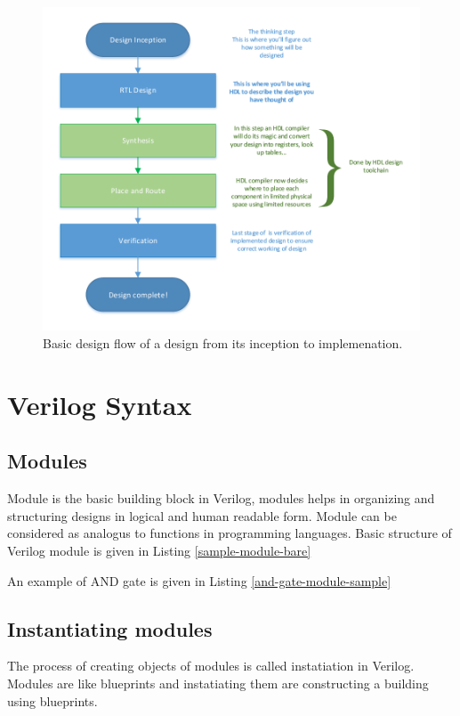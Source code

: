 \documentclass[a4paper,10pt]{article}
\theoremstyle{mytheor}
\newcommand{
  \insertverilog}[3]{
  
}
\begin{document}
\begin{figure}[h] \centering 
  \includegraphics[width=\linewidth]{./resources/hdl_design_flow.pdf}
  \caption{Basic design flow of a design from its inception to implemenation.}
  \label{Fig:bst_sample_names}
\end{figure} 

\section*{Verilog Syntax}
\subsection*{Modules}
Module is the basic building block in Verilog, modules helps in organizing and structuring designs in logical and human readable form. Module can be considered as analogus to functions in programming languages. Basic structure of Verilog module is given in Listing \ref{sample-module-bare} 

\insertverilog{./verilog_files/module.v}{sample-module-bare}{\text{Sample module indicating its structure}}

An example of AND gate is given in Listing \ref{and-gate-module-sample}
\insertverilog{./verilog_files/andGate.v}{and-gate-module-sample}{\text{Illustrative AND gate module}}

\subsection*{Instantiating modules}
The process of creating objects of modules is called instatiation in Verilog. Modules are like blueprints and instatiating them are constructing a building using blueprints.
  
\end{document}
